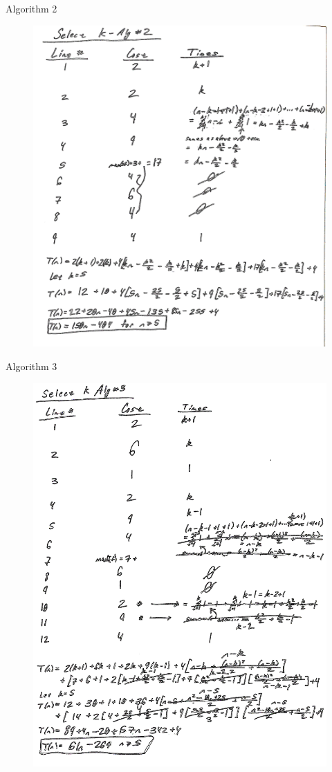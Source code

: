 \documentclass{article}
\begin{document}
\begin{enumerate}
  Algorithm 2
  \begin{figure}[H]
    \centering
    \includegraphics[width = \textwidth]{pics/alg2}
  \end{figure}

  Algorithm 3
  \begin{figure}[H]
    \centering
    \includegraphics[width = \textwidth]{pics/alg3}
  \end{figure}


\end{enumerate}
\end{document}
